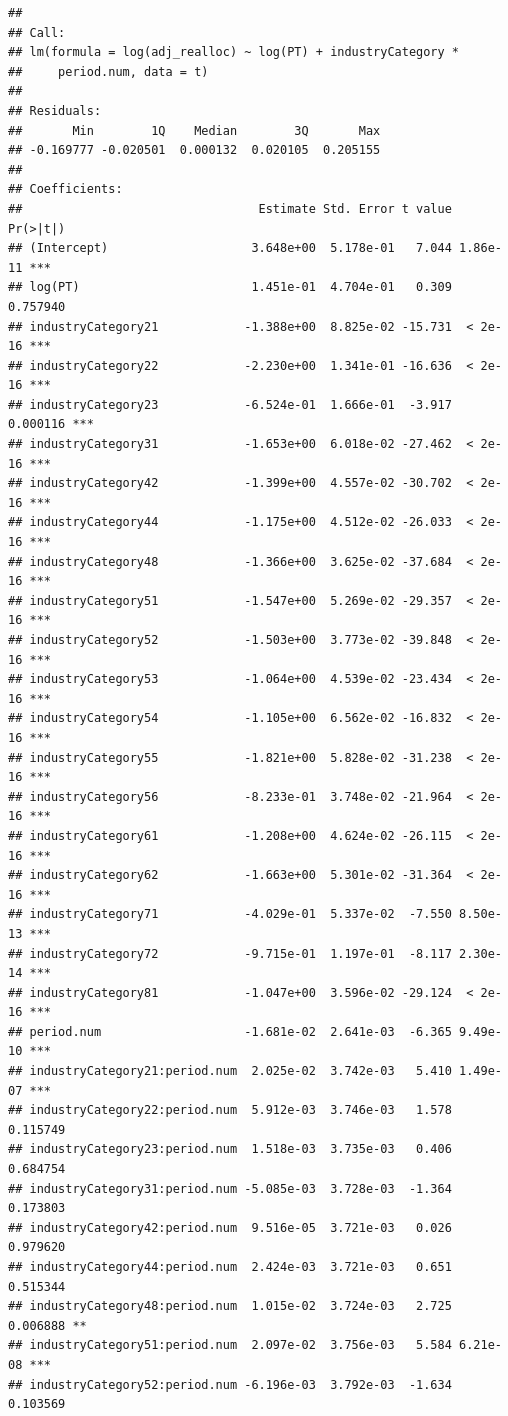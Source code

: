 \documentclass[
]{article}
\begin{document}
\begin{verbatim}
## 
## Call:
## lm(formula = log(adj_realloc) ~ log(PT) + industryCategory * 
##     period.num, data = t)
## 
## Residuals:
##       Min        1Q    Median        3Q       Max 
## -0.169777 -0.020501  0.000132  0.020105  0.205155 
## 
## Coefficients:
##                                 Estimate Std. Error t value Pr(>|t|)    
## (Intercept)                    3.648e+00  5.178e-01   7.044 1.86e-11 ***
## log(PT)                        1.451e-01  4.704e-01   0.309 0.757940    
## industryCategory21            -1.388e+00  8.825e-02 -15.731  < 2e-16 ***
## industryCategory22            -2.230e+00  1.341e-01 -16.636  < 2e-16 ***
## industryCategory23            -6.524e-01  1.666e-01  -3.917 0.000116 ***
## industryCategory31            -1.653e+00  6.018e-02 -27.462  < 2e-16 ***
## industryCategory42            -1.399e+00  4.557e-02 -30.702  < 2e-16 ***
## industryCategory44            -1.175e+00  4.512e-02 -26.033  < 2e-16 ***
## industryCategory48            -1.366e+00  3.625e-02 -37.684  < 2e-16 ***
## industryCategory51            -1.547e+00  5.269e-02 -29.357  < 2e-16 ***
## industryCategory52            -1.503e+00  3.773e-02 -39.848  < 2e-16 ***
## industryCategory53            -1.064e+00  4.539e-02 -23.434  < 2e-16 ***
## industryCategory54            -1.105e+00  6.562e-02 -16.832  < 2e-16 ***
## industryCategory55            -1.821e+00  5.828e-02 -31.238  < 2e-16 ***
## industryCategory56            -8.233e-01  3.748e-02 -21.964  < 2e-16 ***
## industryCategory61            -1.208e+00  4.624e-02 -26.115  < 2e-16 ***
## industryCategory62            -1.663e+00  5.301e-02 -31.364  < 2e-16 ***
## industryCategory71            -4.029e-01  5.337e-02  -7.550 8.50e-13 ***
## industryCategory72            -9.715e-01  1.197e-01  -8.117 2.30e-14 ***
## industryCategory81            -1.047e+00  3.596e-02 -29.124  < 2e-16 ***
## period.num                    -1.681e-02  2.641e-03  -6.365 9.49e-10 ***
## industryCategory21:period.num  2.025e-02  3.742e-03   5.410 1.49e-07 ***
## industryCategory22:period.num  5.912e-03  3.746e-03   1.578 0.115749    
## industryCategory23:period.num  1.518e-03  3.735e-03   0.406 0.684754    
## industryCategory31:period.num -5.085e-03  3.728e-03  -1.364 0.173803    
## industryCategory42:period.num  9.516e-05  3.721e-03   0.026 0.979620    
## industryCategory44:period.num  2.424e-03  3.721e-03   0.651 0.515344    
## industryCategory48:period.num  1.015e-02  3.724e-03   2.725 0.006888 ** 
## industryCategory51:period.num  2.097e-02  3.756e-03   5.584 6.21e-08 ***
## industryCategory52:period.num -6.196e-03  3.792e-03  -1.634 0.103569    

\end{verbatim}
\end{document}
